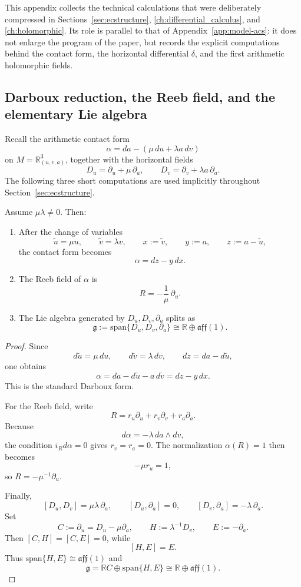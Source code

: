 This appendix collects the technical calculations that were deliberately compressed in Sections~\ref{sec:ecstructure}, \ref{ch:differential_calculus}, and \ref{ch:holomorphic}. Its role is parallel to that of Appendix~\ref{app:model-acs}: it does not enlarge the program of the paper, but records the explicit computations behind the contact form, the horizontal differential $\delta$, and the first arithmetic holomorphic fields.

\subsection{Darboux reduction, the Reeb field, and the elementary Lie algebra}
\label{appD:darboux-reeb}

Recall the arithmetic contact form
\[
\alpha=da-(\mu\,du+\lambda a\,dv)
\]
on $M=\mathbb R^3_{(u,v,a)}$, together with the horizontal fields
\[
D_u=\partial_u+\mu\,\partial_a,
\qquad
D_v=\partial_v+\lambda a\,\partial_a.
\]
The following three short computations are used implicitly throughout Section~\ref{sec:ecstructure}.

\begin{proposition}
\label{prop:appD-darboux-reeb}
Assume $\mu\lambda\neq 0$.
Then:
\begin{enumerate}
    \item After the change of variables
    \[
    \tilde u=\mu u,
    \qquad
    \tilde v=\lambda v,
    \qquad
    x:=\tilde v,
    \qquad
    y:=a,
    \qquad
    z:=a-\tilde u,
    \]
    the contact form becomes
    \[
    \alpha = dz-y\,dx.
    \]

    \item The Reeb field of $\alpha$ is
    \[
    R=-\frac1\mu\,\partial_u.
    \]

    \item The Lie algebra generated by $D_u,D_v,\partial_a$ splits as
    \[
    \mathfrak g:=\mathrm{span}\{D_u,D_v,\partial_a\}
    \cong \mathbb R \oplus \mathfrak{aff}(1).
    \]
\end{enumerate}
\end{proposition}

\begin{proof}
Since
\[
 d\tilde u=\mu\,du,
 \qquad
 d\tilde v=\lambda\,dv,
 \qquad
 dz=da-d\tilde u,
\]
one obtains
\[
\alpha=da-d\tilde u-a\,d\tilde v=dz-y\,dx.
\]
This is the standard Darboux form.

For the Reeb field, write
\[
R=r_u\partial_u+r_v\partial_v+r_a\partial_a.
\]
Because
\[
d\alpha=-\lambda\,da\wedge dv,
\]
the condition $i_Rd\alpha=0$ gives $r_v=r_a=0$.
The normalization $\alpha(R)=1$ then becomes
\[
-\mu r_u=1,
\]
so $R=-\mu^{-1}\partial_u$.

Finally,
\[
[D_u,D_v]=\mu\lambda\,\partial_a,
\qquad
[D_u,\partial_a]=0,
\qquad
[D_v,\partial_a]=-\lambda\,\partial_a.
\]
Set
\[
C:=\partial_u=D_u-\mu\partial_a,
\qquad
H:=\lambda^{-1}D_v,
\qquad
E:=-\partial_a.
\]
Then $[C,H]=[C,E]=0$, while
\[
[H,E]=E.
\]
Thus $\mathrm{span}\{H,E\}\cong\mathfrak{aff}(1)$ and
\[
\mathfrak g=\mathbb RC\oplus\mathrm{span}\{H,E\}\cong\mathbb R\oplus\mathfrak{aff}(1).
\]
\end{proof}


